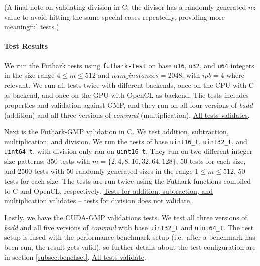 (A final note on validating division in C; the divisor has a randomly generated
$nz$ value to avoid hitting the same special cases repeatedly, providing more
meaningful tests.)

\paragraph{Test Results}
We run the Futhark tests using \texttt{futhark-test} on base \texttt{u16},
\texttt{u32}, and \texttt{u64} integers in the size range $4\leq m \leq 512$ and
$num\_instances = 2048$, with $ipb = 4$ where relevant. We run all tests twice
with different backends, once on the CPU with C as backend, and once on the GPU
with OpenCL as backend. The tests includes properties and validation against
GMP, and they run on all four versions of \textit{badd} (addition) and all three
versions of \textit{convmul} (multiplication). \uline{All tests validates}.

Next is the Futhark-GMP validation in C. We test addition, subtraction,
multiplication, and division. We run the tests of base \texttt{uint16\_t},
\texttt{uint32\_t}, and \texttt{uint64\_t}, with division only ran on
\texttt{uint16\_t}. They run on two different integer size patterns: 350 tests
with $m=\{2,4,8,16,32,64,128\}$, 50 tests for each size, and 2500 tests with 50
randomly generated sizes in the range $1\leq m \leq 512$, 50 tests for each size. The
tests are run twice using the Futhark functions compiled to C and OpenCL,
respectively. \uline{Tests for addition, subtraction, and multiplication
  validates -- tests for division does not validate}.

Lastly, we have the CUDA-GMP validations tests. We test all three versions of
\textit{badd} and all five versions of \textit{convmul} with base
\texttt{uint32\_t} and \texttt{uint64\_t}. The test setup is fused with the
performance benchmark setup (i.e.\ after a benchmark has been run, the result
gets valid), so further details about the test-configuration are in section
\ref{subsec:benchset}. \uline{All tests validate}.

